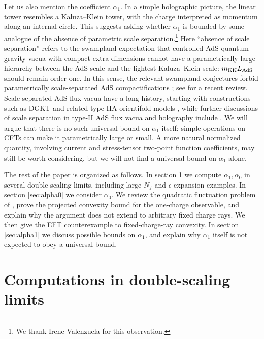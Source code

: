 \documentclass[a4paper,11pt]{article}
\begin{document}
Let us also mention the coefficient $\alpha_1$. In a simple holographic picture, the linear tower resembles a Kaluza--Klein tower, with the charge interpreted as momentum along an internal circle. This suggests asking whether $\alpha_1$ is bounded by some analogue of the absence of parametric scale separation.\footnote{We thank Irene Valenzuela for this observation.} Here ``absence of scale separation'' refers to the swampland expectation that controlled AdS quantum gravity vacua with compact extra dimensions cannot have a parametrically large hierarchy between the AdS scale and the lightest Kaluza--Klein scale: $m_{\rm KK}L_{\rm AdS}$ should remain order one. In this sense, the relevant swampland conjectures forbid parametrically scale-separated AdS compactifications
\cite{Gautason:2015tig,Lust:2019zwm,Cribiori:2022nke}; see \cite{COUDARCHET20241} for a recent review. Scale-separated AdS flux vacua have a long history, starting with constructions such as DGKT and related type-IIA orientifold models \cite{DeWolfe:2005uu,Camara:2005dc}, while further discussions of scale separation in type-II AdS flux vacua and holography include
\cite{Font:2019uva,Polchinski:2009ch,deAlwis:2014wia,Conlon:2018eyr,Conlon:2020wmc,Collins:2022nux}. We will argue that there is no such universal bound on $\alpha_1$ itself: simple operations on CFTs can make it parametrically large or small. A more natural normalized quantity, involving current and stress-tensor two-point function coefficients, may still be worth considering, but we will not find a universal bound on $\alpha_1$ alone.

The rest of the paper is organized as follows. In section \ref{sec:computations} we compute $\alpha_1,\alpha_0$ in several double-scaling limits, including large-$N_f$ and $\epsilon$-expansion examples. In section \ref{sec:alpha0} we consider $\alpha_0$. We review the quadratic fluctuation problem of \cite{Cuomo:2024fuy}, prove the projected convexity bound for the one-charge observable, and explain why the argument does not extend to arbitrary fixed charge rays. We then give the EFT counterexample to fixed-charge-ray convexity. In section \ref{sec:alpha1} we discuss possible bounds on $\alpha_1$, and explain why $\alpha_1$ itself is not expected to obey a universal bound.

\section{Computations in double-scaling limits}\label{sec:computations}
\end{document}
